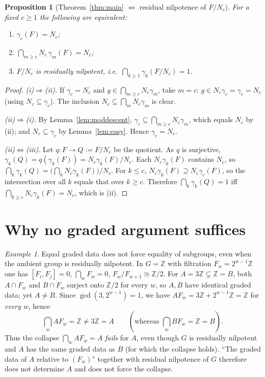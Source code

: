 \documentclass{amsart}
\newtheorem{proposition}{Proposition}
\theoremstyle{definition}
\theoremstyle{remark}
\newtheorem{example}{Example}
\begin{document}
\begin{proposition}[Theorem~\ref{thm:main} $\Leftrightarrow$ residual nilpotence of $F/N_c$]
\label{prop:equivresnilp}
For a fixed $c\ge1$ the following are equivalent:
\begin{enumerate}
\item[\textup{(i)}] $\gamma_c(F)=N_c$;
\item[\textup{(ii)}] $\bigcap_{m\ge c}N_c\,\gamma_m(F)=N_c$;
\item[\textup{(iii)}] $F/N_c$ is residually nilpotent, i.e.\ $\bigcap_{k\ge1}\gamma_k(F/N_c)=1$.
\end{enumerate}
\end{proposition}
\begin{proof}
\emph{(i)$\Rightarrow$(ii).} If $\gamma_c=N_c$ and $g\in\bigcap_{m\ge c}N_c\gamma_m$,
take $m=c$: $g\in N_c\gamma_c=\gamma_c=N_c$ (using $N_c\subseteq\gamma_c$). The
inclusion $N_c\subseteq\bigcap_m N_c\gamma_m$ is clear.

\emph{(ii)$\Rightarrow$(i).} By Lemma~\ref{lem:moddescent}, $\gamma_c\subseteq
\bigcap_{m\ge c}N_c\gamma_m$, which equals $N_c$ by (ii); and $N_c\subseteq\gamma_c$
by Lemma~\ref{lem:easy}. Hence $\gamma_c=N_c$.

\emph{(ii)$\Leftrightarrow$(iii).} Let $q\colon F\to Q:=F/N_c$ be the quotient. As
$q$ is surjective, $\gamma_k(Q)=q(\gamma_k(F))=N_c\gamma_k(F)/N_c$. Each
$N_c\gamma_k(F)$ contains $N_c$, so
$\bigcap_k\gamma_k(Q)=\big(\bigcap_k N_c\gamma_k(F)\big)/N_c$. For $k\le c$,
$N_c\gamma_k(F)\supseteq N_c\gamma_c(F)$, so the intersection over all $k$ equals that
over $k\ge c$. Therefore $\bigcap_k\gamma_k(Q)=1$ iff $\bigcap_{k\ge c}N_c\gamma_k(F)
=N_c$, which is (ii).
\end{proof}

\section{Why no graded argument suffices}\label{sec:why}

\begin{example}\label{ex:Z}
Equal graded data does not force equality of subgroups, even when the ambient group
is residually nilpotent. In $G=\mathbb Z$ with filtration $F_w=2^{w-1}\mathbb Z$ one
has $[F_i,F_j]=0$, $\bigcap_w F_w=0$, $F_w/F_{w+1}\cong\mathbb Z/2$. For
$A=3\mathbb Z\subsetneq\mathbb Z=B$, both $A\cap F_w$ and $B\cap F_w$ surject onto
$\mathbb Z/2$ for every $w$, so $A,B$ have identical graded data; yet $A\ne B$. Since
$\gcd(3,2^{w-1})=1$, we have $AF_w=3\mathbb Z+2^{w-1}\mathbb Z=\mathbb Z$ for
\emph{every} $w$, hence
\[
\bigcap_w A F_w=\mathbb Z\ne 3\mathbb Z=A
\qquad(\text{whereas }\bigcap_w BF_w=\mathbb Z=B).
\]
Thus the collapse $\bigcap_w AF_w=A$ \emph{fails} for $A$, even though $G$ is residually
nilpotent and $A$ has the same graded data as $B$ (for which the collapse holds). ``The
graded data of $A$ relative to $(F_w)$'' together with residual nilpotence of $G$
therefore does not determine $A$ and does not force the collapse.
\end{example}
\end{document}
